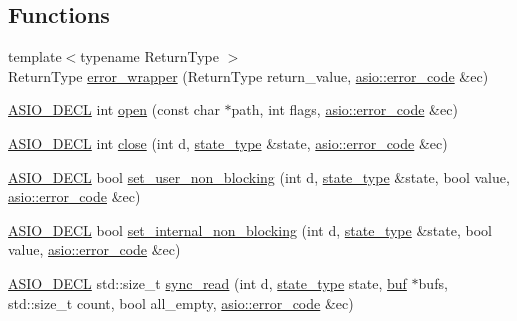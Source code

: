 \subsection*{Functions}
\begin{DoxyCompactItemize}
\item 
{\footnotesize template$<$typename Return\+Type $>$ }\\Return\+Type \hyperlink{namespaceasio_1_1detail_1_1descriptor__ops_ab71485e5ade2968303d4ace269d5d63e}{error\+\_\+wrapper} (Return\+Type return\+\_\+value, \hyperlink{classasio_1_1error__code}{asio\+::error\+\_\+code} \&ec)
\item 
\hyperlink{config_8hpp_ab54d01ea04afeb9a8b39cfac467656b7}{A\+S\+I\+O\+\_\+\+D\+E\+C\+L} int \hyperlink{namespaceasio_1_1detail_1_1descriptor__ops_a8801efb10c431989bba3ded2e01adc52}{open} (const char $\ast$path, int flags, \hyperlink{classasio_1_1error__code}{asio\+::error\+\_\+code} \&ec)
\item 
\hyperlink{config_8hpp_ab54d01ea04afeb9a8b39cfac467656b7}{A\+S\+I\+O\+\_\+\+D\+E\+C\+L} int \hyperlink{namespaceasio_1_1detail_1_1descriptor__ops_adb08bf6a6ad29284d586da2720ba7053}{close} (int d, \hyperlink{namespaceasio_1_1detail_1_1descriptor__ops_a773b997617ef697b51ff3f91f6e48764}{state\+\_\+type} \&state, \hyperlink{classasio_1_1error__code}{asio\+::error\+\_\+code} \&ec)
\item 
\hyperlink{config_8hpp_ab54d01ea04afeb9a8b39cfac467656b7}{A\+S\+I\+O\+\_\+\+D\+E\+C\+L} bool \hyperlink{namespaceasio_1_1detail_1_1descriptor__ops_a45d5bc45c4575bb02d8aea7a2785e698}{set\+\_\+user\+\_\+non\+\_\+blocking} (int d, \hyperlink{namespaceasio_1_1detail_1_1descriptor__ops_a773b997617ef697b51ff3f91f6e48764}{state\+\_\+type} \&state, bool value, \hyperlink{classasio_1_1error__code}{asio\+::error\+\_\+code} \&ec)
\item 
\hyperlink{config_8hpp_ab54d01ea04afeb9a8b39cfac467656b7}{A\+S\+I\+O\+\_\+\+D\+E\+C\+L} bool \hyperlink{namespaceasio_1_1detail_1_1descriptor__ops_a9162476dcac561f880711939b461ccf7}{set\+\_\+internal\+\_\+non\+\_\+blocking} (int d, \hyperlink{namespaceasio_1_1detail_1_1descriptor__ops_a773b997617ef697b51ff3f91f6e48764}{state\+\_\+type} \&state, bool value, \hyperlink{classasio_1_1error__code}{asio\+::error\+\_\+code} \&ec)
\item 
\hyperlink{config_8hpp_ab54d01ea04afeb9a8b39cfac467656b7}{A\+S\+I\+O\+\_\+\+D\+E\+C\+L} std\+::size\+\_\+t \hyperlink{namespaceasio_1_1detail_1_1descriptor__ops_ac2ccb11d1dc712151611a4fbe25aa5ac}{sync\+\_\+read} (int d, \hyperlink{namespaceasio_1_1detail_1_1descriptor__ops_a773b997617ef697b51ff3f91f6e48764}{state\+\_\+type} state, \hyperlink{namespaceasio_1_1detail_1_1descriptor__ops_ad10e658a754ff775cdcc3b3decd3c8c9}{buf} $\ast$bufs, std\+::size\+\_\+t count, bool all\+\_\+empty, \hyperlink{classasio_1_1error__code}{asio\+::error\+\_\+code} \&ec)

\end{DoxyCompactItemize}
